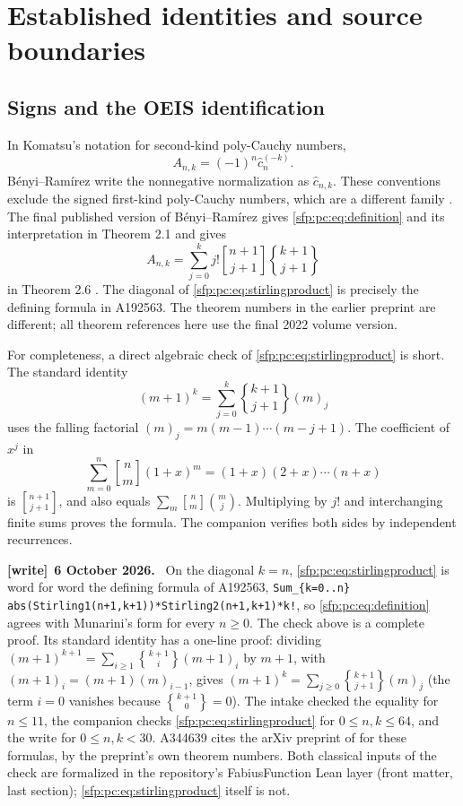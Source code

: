 \documentclass[11pt,letterpaper]{article}
\numberwithin{equation}{section}
\theoremstyle{definition}\newtheorem{definition}[theorem]{Definition}
\theoremstyle{remark}\newtheorem{remark}[theorem]{Remark}
\newcommand{\sone}[2]{\genfrac{[}{]}{0pt}{}{#1}{#2}}
\newcommand{\stwo}[2]{\genfrac{\{} {\}}{0pt}{}{#1}{#2}}
\newenvironment{writenote}[1][]{\par\smallskip\begingroup\small
 \noindent\textbf{[write]}\if\relax\detokenize{#1}\relax\else~\textbf{#1.}\fi\ }%
 {\par\endgroup\smallskip}
\begin{document}
\section{Established identities and source boundaries}\label{sfp:pc:sec:sources}

\subsection{Signs and the OEIS identification}\label{sfp:pc:sub:signs}

In Komatsu's notation for second-kind poly-Cauchy numbers,
\[
 A_{n,k}=(-1)^n\widehat c_n^{(-k)}.
\]
B\'enyi--Ram\'irez write the nonnegative normalization as
$\widehat c_{n,k}$. These conventions exclude the signed first-kind
poly-Cauchy numbers, which are a different family
\cite[Theorem 4]{komatsu2013}. The final published version of
B\'enyi--Ram\'irez gives \eqref{sfp:pc:eq:definition} and its interpretation
in Theorem 2.1 and gives
\begin{equation}\label{sfp:pc:eq:stirlingproduct}
 A_{n,k}=\sum_{j=0}^k j!\sone{n+1}{j+1}\stwo{k+1}{j+1}
\end{equation}
in Theorem 2.6 \cite{benyi}. The diagonal of
\eqref{sfp:pc:eq:stirlingproduct} is precisely the defining formula in
A192563. The theorem numbers in the earlier preprint are different;
all theorem references here use the final 2022 volume version.

For completeness, a direct algebraic check of
\eqref{sfp:pc:eq:stirlingproduct} is short. The standard identity
\[
 (m+1)^k=\sum_{j=0}^k\stwo{k+1}{j+1}(m)_j
\]
uses the falling factorial $(m)_j=m(m-1)\cdots(m-j+1)$.
The coefficient of $x^j$ in
\[
 \sum_{m=0}^n\sone nm(1+x)^m
      =(1+x)(2+x)\cdots(n+x)
\]
is $\sone{n+1}{j+1}$, and also equals
$\sum_m\sone nm\binom mj$. Multiplying by $j!$ and interchanging
finite sums proves the formula. The companion verifies both sides
by independent recurrences.
\begin{writenote}[6 October 2026]
On the diagonal $k=n$, \eqref{sfp:pc:eq:stirlingproduct} is word for word the defining formula of A192563, \verb|Sum_{k=0..n} abs(Stirling1(n+1,k+1))*Stirling2(n+1,k+1)*k!|, so \eqref{sfp:pc:eq:definition} agrees with Munarini's form for every $n\ge0$. The check above is a complete proof. Its standard identity has a one-line proof: dividing $(m+1)^{k+1}=\sum_{i\ge1}\stwo{k+1}{i}(m+1)_i$ by $m+1$, with $(m+1)_i=(m+1)(m)_{i-1}$, gives $(m+1)^k=\sum_{j\ge0}\stwo{k+1}{j+1}(m)_j$ (the term $i=0$ vanishes because $\stwo{k+1}0=0$). The intake checked the equality for $n\le11$, the companion checks \eqref{sfp:pc:eq:stirlingproduct} for $0\le n,k\le64$, and the write for $0\le n,k<30$. A344639 cites the arXiv preprint of \cite{benyi} for these formulas, by the preprint's own theorem numbers. Both classical inputs of the check are formalized in the repository's FabiusFunction Lean layer (front matter, last section); \eqref{sfp:pc:eq:stirlingproduct} itself is not.
\end{writenote}
\end{document}
